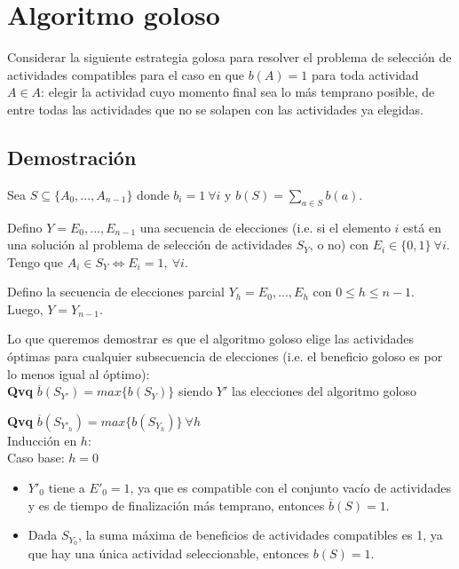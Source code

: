 \documentclass[10pt, a4paper]{article}
\begin{document}
\section{Algoritmo goloso}

Considerar la siguiente estrategia golosa para resolver el problema de selección de actividades compatibles para el caso en que $b(A) = 1$ para toda actividad $A \in A$: elegir la actividad cuyo momento final sea lo más temprano posible, de entre todas las actividades que no se solapen con las actividades ya elegidas.

\subsection{Demostración}
Sea $S \subseteq \{A_0,...,A_{n-1}\}$ donde $b_i = 1 \ \forall i$ y $b(S) = \sum_{a \in S}b(a)$.

Defino $Y = E_0,...,E_{n-1}$ una secuencia de elecciones (i.e. si el elemento $i$ está en una solución al problema de selección de actividades $S_Y$, o no) con $E_i \in \{0, 1\} \ \forall i$. Tengo que $A_i \in S_Y \iff E_i = 1, \ \forall i$.

Defino la secuencia de elecciones parcial $Y_h = E_0,...,E_{h}$ con $0 \leq h \leq n-1$. Luego, $Y = Y_{n-1}$.

Lo que queremos demostrar es que el algoritmo goloso elige las actividades óptimas para cualquier subsecuencia de elecciones (i.e. el beneficio goloso es por lo menos igual al óptimo): \\

\textbf{Qvq} $\overline{b}(S_{Y'}) = max\{b(S_Y)\}$ siendo $Y'$ las elecciones del algoritmo goloso

\textbf{Qvq} $\overline{b}(S_{Y'_h}) = max\{b(S_{Y_h})\} \ \forall h$ \\

Inducción en $h$: \\

Caso base: $h = 0$ 

\begin{itemize}
    \item $Y'_0$ tiene a $E'_0 = 1$, ya que es compatible con el conjunto vacío de actividades y es de tiempo de finalización más temprano, entonces $\overline{b}(S) = 1$.
    \item Dada $S_{Y_0}$, la suma máxima de beneficios de actividades compatibles es 1, ya que hay una única actividad seleccionable, entonces $b(S) = 1$.
\end{itemize}
\end{document}
